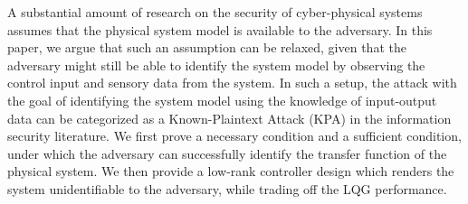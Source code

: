 A substantial amount of research on the security of cyber-physical systems assumes that the physical system model is available to the adversary. In this paper, we argue that such an assumption can be relaxed, given that the adversary might still be able to identify the system model by observing the control input and sensory data from the system. In such a setup, the attack with the goal of identifying the system model using the knowledge of input-output data can be categorized as a Known-Plaintext Attack (KPA) in the information security literature. We first prove a necessary condition and a sufficient condition, under which the adversary can successfully identify the transfer function of the physical system. We then provide a low-rank controller design which renders the system unidentifiable to the adversary, while trading off the LQG performance. 
